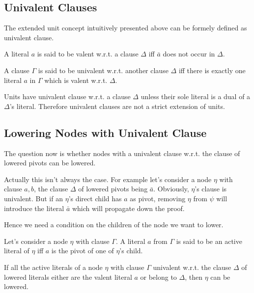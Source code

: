 \documentclass{llncs}
\begin{document}
\subsection{Univalent Clauses}

The extended unit concept intuitively presented above can be formely defined as
univalent clause.

\begin{definition}
A literal $a$ is said to be valent w.r.t. a clause $\Delta$ iff $\bar{a}$ does
not occur in $\Delta$.
\end{definition}

\begin{definition}
A clause $\Gamma$ is said to be univalent w.r.t. another clause $\Delta$ iff
there is exactly one literal $a$ in $\Gamma$ which is valent w.r.t. $\Delta$.
\end{definition}

Units have univalent clause w.r.t. a clause $\Delta$ unless their sole literal
is a dual of a $\Delta$'s literal. Therefore univalent clauses are not a
strict extension of units.


\subsection{Lowering Nodes with Univalent Clause}

The question now is whether nodes with a univalent clause w.r.t. the clause of
lowered pivots can be lowered.

Actually this isn't always the case. For example let's consider a node
$\eta$ with clause $a,b$, the clause $\Delta$ of lowered pivots being
$\bar{a}$. Obviously, $\eta$'s clause is univalent. But if an $\eta$'s
direct child has $a$ as pivot, removing $\eta$ from $\psi$ will introduce
the literal $\bar{a}$ which will propagate down the proof.

Hence we need a condition on the children of the node we want to lower.

\begin{definition}
Let's consider a node $\eta$ with clause $\Gamma$. A literal $a$ from
$\Gamma$ is said to be an active literal of $\eta$ iff $a$ is the pivot of
one of $\eta$'s child.
\end{definition}

\begin{theorem}
If all the active literals of a node $\eta$ with clause $\Gamma$ univalent
w.r.t. the clause $\Delta$ of lowered literals either are the valent
literal $a$ or belong to $\Delta$, then $\eta$ can be lowered.
\end{theorem}
\end{document}
